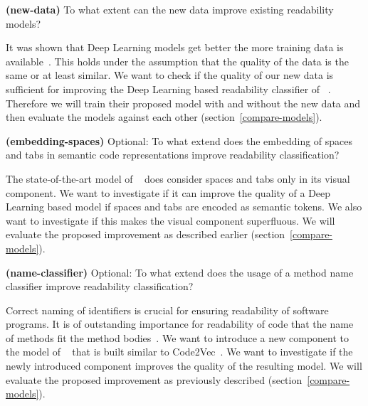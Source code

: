 \documentclass[%
class=scrreprt,
chapterprefix=false,%
open=right,%
twoside=false,%
paper=a4,%
logofile={Logo\_zentral\_farbig\_EN.png},%
thesistype=master,%
UKenglish,%
]{se2thesis}
\begin{document}
	\begin{resq} \textbf{(new-data)} To what extent can the new data improve existing readability models?\end{resq} \label{new-data}
	It was shown that Deep Learning models get better the more training data is available~\cite{hestness2017deep}. This holds under the assumption that the quality of the data is the same or at least similar. We want to check if the quality of our new data is sufficient for improving the Deep Learning based readability classifier of \citeauthor{mi2022towards}~\cite{mi2022towards}. Therefore we will train their proposed model with and without the new data and then evaluate the models against each other (section~\ref{compare-models}).
	
	\pagebreak
	
	
	\begin{resq} \textbf{(embedding-spaces)} Optional: To what extend does the embedding of spaces and tabs in semantic code representations improve readability classification?\end{resq} \label{embedding-spaces}
	The state-of-the-art model of \citeauthor{mi2022towards}~\cite{mi2022towards} does consider spaces and tabs only in its visual component. We want to investigate if it can improve the quality of a Deep Learning based model if spaces and tabs are encoded as semantic tokens. We also want to investigate if this makes the visual component superfluous. We will evaluate the proposed improvement as described earlier (section~\ref{compare-models}).
	
	\begin{resq} \textbf{(name-classifier)} Optional: To what extend does the usage of a method name classifier improve readability classification?\end{resq} \label{name-classifier}
	Correct naming of identifiers is crucial for ensuring readability of software programs. It is of outstanding importance for readability of code that the name of methods fit the method bodies~\cite{liu2019learning}. We want to introduce a new component to the model of \citeauthor{mi2022towards}~\cite{mi2022towards} that is built similar to Code2Vec~\cite{alon2019code2vec}. We want to investigate if the newly introduced component improves the quality of the resulting model. We will evaluate the proposed improvement as previously described (section~\ref{compare-models}).
	
\end{document}
